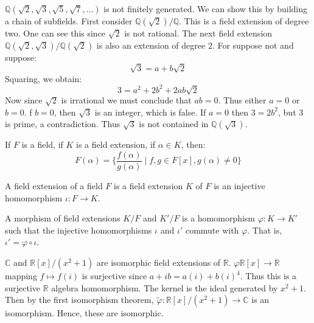     \begin{example}
        $\mathbb{Q}(\sqrt{2},\sqrt{3},\sqrt{5},\sqrt{7},\dots)$ is not
        finitely generated. We can show this by building a chain of
        subfields. First consider $\mathbb{Q}(\sqrt{2})/\mathbb{Q}$. This
        is a field extension of degree two. One can see this since
        $\sqrt{2}$ is not rational. The next field extension
        $\mathbb{Q}(\sqrt{2},\sqrt{3})/\mathbb{Q}(\sqrt{2})$ is also an
        extension of degree 2. For suppose not and suppose:
        \begin{equation}
            \sqrt{3}=a+b\sqrt{2}
        \end{equation}
        Squaring, we obtain:
        \begin{equation}
            3=a^{2}+2b^{2}+2ab\sqrt{2}
        \end{equation}
        Now since $\sqrt{2}$ is irrational we must conclude that $ab=0$.
        Thus either $a=0$ or $b=0$. f $b=0$, then $\sqrt{3}$ is an integer,
        which is false. If $a=0$ then $3=2b^{2}$, but $3$ is prime, a
        contradiction. Thus $\sqrt{3}$ is not contained in
        $\mathbb{Q}(\sqrt{3})$.
    \end{example}
    \begin{theorem}
        If $F$ is a field, if $K$ is a field extension, if $\alpha\in{K}$,
        then:
        \begin{equation}
            F(\alpha)=\big\{\frac{f(\alpha)}{g(\alpha)}\;|\;
                f,g\in{F}[x],g(\alpha)\ne{0}\big\}
        \end{equation}
    \end{theorem}
    \begin{theorem}
        A field extension of a field $F$ is a field extension $K$ of $F$
        is an injective homomorphism $\iota:F\rightarrow{K}$.
    \end{theorem}
    \begin{definition}
        A morphism of field extensions $K/F$ and $K'/F$ is a homomorphism
        $\varphi:K\rightarrow{K}'$ such that the injective homomorphisms
        $\iota$ and $\iota'$ commute with $\varphi$. That is,
        $\iota'=\varphi\circ\iota$.
    \end{definition}
    \begin{example}
        $\mathbb{C}$ and $\mathbb{R}[x]/(x^{2}+1)$ are isomorphic field
        extensions of $\mathbb{R}$.
        $\varphi\mathbb{R}[x]\rightarrow\mathbb{R}$ mapping
        $f\mapsto{f}(i)$ is surjective since $a+ib=a(i)+b(i)^{4}$. Thus this
        is a surjective $\mathbb{R}$ algebra homomorphism. The kernel is
        the ideal generated by $x^{2}+1$. Then by the first isomorphism
        theorem,
        $\tilde{\varphi}:\mathbb{R}[x]/(x^{2}+1)\rightarrow\mathbb{C}$ is an
        isomorphism. Hence, these are isomorphic.
    \end{example}
